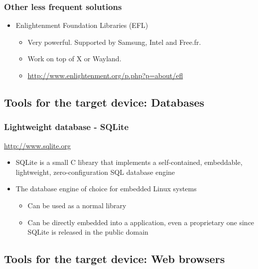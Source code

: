 \begin{frame}
  \frametitle{Other less frequent solutions}
  \begin{itemize}
  \item Enlightenment Foundation Libraries (EFL)
    \begin{itemize}
    \item Very powerful. Supported by Samsung, Intel and Free.fr.
    \item Work on top of X or Wayland.
    \item \url{http://www.enlightenment.org/p.php?p=about/efl}
    \end{itemize}
  \end{itemize}
\end{frame}

\subsection[Databases]{Tools for the target device: Databases}

\begin{frame}
  \frametitle{Lightweight database - SQLite}
  \url{http://www.sqlite.org}

  \begin{itemize}
  \item SQLite is a small C library that implements a self-contained,
    embeddable, lightweight, zero-configuration SQL database engine
  \item The database engine of choice for embedded Linux systems
    \begin{itemize}
    \item Can be used as a normal library
    \item Can be directly embedded into a application, even a
      proprietary one since SQLite is released in the public domain
    \end{itemize}
  \end{itemize}
\end{frame}

\subsection[Web Browsers]{Tools for the target device: Web browsers}

